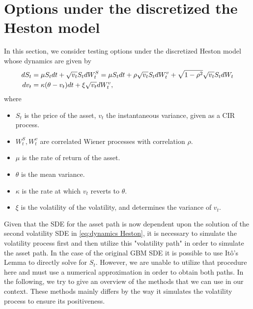 \section{Options under the discretized the Heston model}
In this section, we consider  testing options under the discretized Heston model \cite{heston1993closed,broadie2006exact,kahl2006fast,andersen2007efficient} whose dynamics are given by
\begin{align}\label{eq:dynamics Heston}
dS_t&=\mu S_t dt+\sqrt{v_t}S_t dW_t^S= \mu S_t dt+ \rho\sqrt{v_t}S_t dW_t^v+ \sqrt{1-\rho^2} \sqrt{v_t}S_t dW_t \nonumber\\
dv_t&=\kappa (\theta-v_t)dt+\xi \sqrt{v_t} dW_t^v,
\end{align}
where 

\begin{itemize}
\item $S_t$ is the price of the asset, $v_t$ the instantaneous variance, given as  a CIR process.
\item $W_{t}^{S},W_{t}^{v}$ are correlated Wiener processes with correlation $\rho$.
\item $\mu$  is the rate of return of the asset.
\item $\theta$ is  the mean  variance.
\item $\kappa$ is the rate at which $v_t$ reverts to $\theta$.
\item $\xi$ is the volatility of the volatility, and determines the variance of $v_t$.
\end{itemize}

Given that the SDE for the asset path is now dependent  upon the solution of the second volatility SDE in \eqref{eq:dynamics Heston}, it is necessary to simulate the volatility process first and then utilize this "volatility path" in order to simulate the asset path. In the case of the original GBM SDE it is possible to use It\^o's Lemma to directly solve for $S_t$. However, we are unable to utilize that procedure here and must use a numerical approximation in order to obtain both paths. In the following, we try to give an overview of the methods that we can use in our context. These methods mainly differs by the way it simulates the volatility process to ensure its positiveness.
